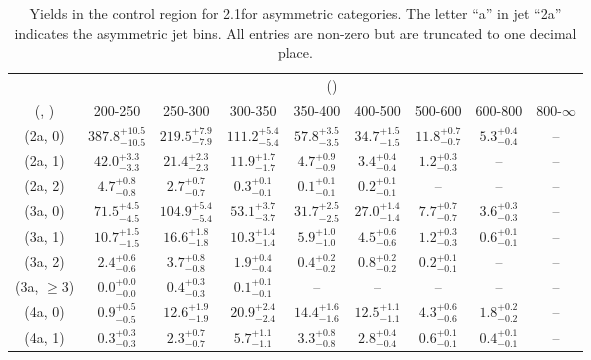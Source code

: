 \begin{table}[h!]
\tiny
\centering
\caption{Yields in the \mmj control region for 2.1\ifb for asymmetric categories. The letter ``a'' in jet \eg ``2a''  indicates the asymmetric jet bins. All entries are non-zero but are truncated to one decimal place.\label{tab:yieldssep_mumu_ewk_asym}}
\begin{tabular}
{ccccccccc}
	\hline\hline
	& \multicolumn{8}{c}{\scalht (\gev)} \\ 
	 (\njet,  \nb) & 200-250 & 250-300 & 300-350 & 350-400 & 400-500 & 500-600 & 600-800 & 800-$\infty$ \\ [0.8ex] 
\hline
	(2a, 0) & $387.8^{+ 10.5 }_{- 10.5 }$ & $219.5^{+ 7.9 }_{- 7.9 }$ & $111.2^{+ 5.4 }_{- 5.4 }$ & $57.8^{+ 3.5 }_{- 3.5 }$ & $34.7^{+ 1.5 }_{- 1.5 }$ & $11.8^{+ 0.7 }_{- 0.7 }$ & $5.3^{+ 0.4 }_{- 0.4 }$ & -- \\[0.5ex] 
	(2a, 1) & $42.0^{+ 3.3 }_{- 3.3 }$ & $21.4^{+ 2.3 }_{- 2.3 }$ & $11.9^{+ 1.7 }_{- 1.7 }$ & $4.7^{+ 0.9 }_{- 0.9 }$ & $3.4^{+ 0.4 }_{- 0.4 }$ & $1.2^{+ 0.3 }_{- 0.3 }$ & -- & -- \\[0.5ex] 
	(2a, 2) & $4.7^{+ 0.8 }_{- 0.8 }$ & $2.7^{+ 0.7 }_{- 0.7 }$ & $0.3^{+ 0.1 }_{- 0.1 }$ & $0.1^{+ 0.1 }_{- 0.1 }$ & $0.2^{+ 0.1 }_{- 0.1 }$ & -- & -- & -- \\[0.5ex] 
	(3a, 0) & $71.5^{+ 4.5 }_{- 4.5 }$ & $104.9^{+ 5.4 }_{- 5.4 }$ & $53.1^{+ 3.7 }_{- 3.7 }$ & $31.7^{+ 2.5 }_{- 2.5 }$ & $27.0^{+ 1.4 }_{- 1.4 }$ & $7.7^{+ 0.7 }_{- 0.7 }$ & $3.6^{+ 0.3 }_{- 0.3 }$ & -- \\[0.5ex] 
	(3a, 1) & $10.7^{+ 1.5 }_{- 1.5 }$ & $16.6^{+ 1.8 }_{- 1.8 }$ & $10.3^{+ 1.4 }_{- 1.4 }$ & $5.9^{+ 1.0 }_{- 1.0 }$ & $4.5^{+ 0.6 }_{- 0.6 }$ & $1.2^{+ 0.3 }_{- 0.3 }$ & $0.6^{+ 0.1 }_{- 0.1 }$ & -- \\[0.5ex] 
	(3a, 2) & $2.4^{+ 0.6 }_{- 0.6 }$ & $3.7^{+ 0.8 }_{- 0.8 }$ & $1.9^{+ 0.4 }_{- 0.4 }$ & $0.4^{+ 0.2 }_{- 0.2 }$ & $0.8^{+ 0.2 }_{- 0.2 }$ & $0.2^{+ 0.1 }_{- 0.1 }$ & -- & -- \\[0.5ex] 
	(3a, $\ge3$) & $0.0^{+ 0.0 }_{- 0.0 }$ & $0.4^{+ 0.3 }_{- 0.3 }$ & $0.1^{+ 0.1 }_{- 0.1 }$ & -- & -- & -- & -- & -- \\[0.5ex] 
	(4a, 0) & $0.9^{+ 0.5 }_{- 0.5 }$ & $12.6^{+ 1.9 }_{- 1.9 }$ & $20.9^{+ 2.4 }_{- 2.4 }$ & $14.4^{+ 1.6 }_{- 1.6 }$ & $12.5^{+ 1.1 }_{- 1.1 }$ & $4.3^{+ 0.6 }_{- 0.6 }$ & $1.8^{+ 0.2 }_{- 0.2 }$ & -- \\[0.5ex] 
	(4a, 1) & $0.3^{+ 0.3 }_{- 0.3 }$ & $2.3^{+ 0.7 }_{- 0.7 }$ & $5.7^{+ 1.1 }_{- 1.1 }$ & $3.3^{+ 0.8 }_{- 0.8 }$ & $2.8^{+ 0.4 }_{- 0.4 }$ & $0.6^{+ 0.1 }_{- 0.1 }$ & $0.4^{+ 0.1 }_{- 0.1 }$ & -- \\[0.5ex] 

\end{tabular}
\end{table}
